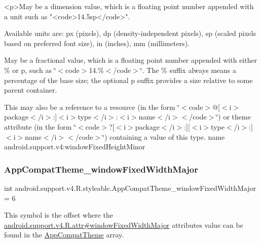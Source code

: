 \begin{DoxyVerb}      <p>May be a dimension value, which is a floating point number appended with a unit such as "<code>14.5sp</code>".
\end{DoxyVerb}
 Available units are\+: px (pixels), dp (density-\/independent pixels), sp (scaled pixels based on preferred font size), in (inches), mm (millimeters). 

May be a fractional value, which is a floating point number appended with either \% or p, such as \char`\"{}$<$code$>$14.\%$<$/code$>$\char`\"{}. The \% suffix always means a percentage of the base size; the optional p suffix provides a size relative to some parent container. 

This may also be a reference to a resource (in the form \char`\"{}$<$code$>$@\mbox{[}$<$i$>$package$<$/i$>$\+:\mbox{]}$<$i$>$type$<$/i$>$\+:$<$i$>$name$<$/i$>$$<$/code$>$\char`\"{}) or theme attribute (in the form \char`\"{}$<$code$>$?\mbox{[}$<$i$>$package$<$/i$>$\+:\mbox{]}\mbox{[}$<$i$>$type$<$/i$>$\+:\mbox{]}$<$i$>$name$<$/i$>$$<$/code$>$\char`\"{}) containing a value of this type.  name android.\+support.\+v4\+:window\+Fixed\+Height\+Minor \mbox{\label{classandroid_1_1support_1_1v4_1_1R_1_1styleable_aeb98c393e76d842baf26189afd20c945}} 
\subsubsection{\texorpdfstring{App\+Compat\+Theme\+\_\+window\+Fixed\+Width\+Major}{AppCompatTheme\_windowFixedWidthMajor}}
{\footnotesize\ttfamily int android.\+support.\+v4.\+R.\+styleable.\+App\+Compat\+Theme\+\_\+window\+Fixed\+Width\+Major = 6\hspace{0.3cm}{\ttfamily [static]}}

This symbol is the offset where the \hyperlink{classandroid_1_1support_1_1v4_1_1R_1_1attr_af5000fa0a4ad63741928b9588aadab35}{android.\+support.\+v4.\+R.\+attr\#window\+Fixed\+Width\+Major} attribute\textquotesingle{}s value can be found in the \hyperlink{classandroid_1_1support_1_1v4_1_1R_1_1styleable_ac07ebbe62ed977f6dcaadc6397840ace}{App\+Compat\+Theme} array.

